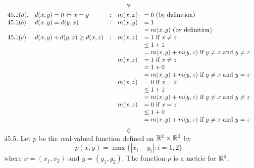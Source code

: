 $$\triangledown$$
\begin{align*}
\begin{array}{l l l l l}
 45.1(a).& d(x, y) = 0 \Leftrightarrow  x =y&:&m(x, x)& = 0\text{ (by definition)}\\
 45.1(b). &d(x, y) = d(y, x)&:&m(x, y)&=1\\
 &&&&=m(x, y)\text{ (by definition)}\\
45.1 (c). &d(x,y) + d(y, z)\geq d(x, z)&:&m(x, z)&=1 \text{ if } x\neq z\\
&&&&\leq 1+1\\
&&&&= m(x, y)+m(y, z)\text{ if } y\neq x\text{ and } y\neq z\\
&&&m(x, z)&=1 \text{ if } x\neq z\\
&&&&= 1+0\\
&&&&= m(x, y)+m(y, z)\text{ if } y\neq x\text{ and } y= z\\
&&&m(x, z)&=0 \text{ if } x= z\\
&&&&\leq 1+1\\
&&&&= m(x, y)+m(y, z)\text{ if } y\neq x\text{ and } y\neq z\\
&&&m(x, z)&=0 \text{ if } x= z\\
&&&&\leq 1+0\\
&&&&= m(x, y)+m(y, z)\text{ if } y\neq x\text{ and } y=z
\end{array}
\end{align*}
$$\lozenge$$
$\mathbf{45.5.}$ Let $p$ be the real-valued function defined on $\mathbb{R}^2\times\mathbb{R}^2$ by 
$$p(x,y)= \max{\{|x_i-y_i|: i=1,2\}}$$
where $x=(x_1,x_2)$ and $y=(y_1,y_2)$. The function $p$ is a metric for $\mathbb{R}^2$.

